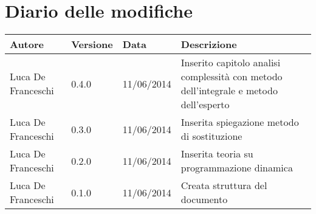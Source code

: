 \section*{Diario delle modifiche}

\begin{center}

	\begin{table}[htpd]
		\begin{tabular}{| l | l | l | p{50mm} |}
			\hline
			\hline
			\textbf{Autore} & \textbf{Versione} & \textbf{Data} & \textbf{Descrizione} \\
			\hline
			\hline
			Luca De Franceschi & 0.4.0 & 11/06/2014 & Inserito capitolo analisi complessità con metodo dell'integrale e metodo dell'esperto \\ \hline
			Luca De Franceschi & 0.3.0 & 11/06/2014 & Inserita spiegazione metodo di sostituzione \\ \hline
			Luca De Franceschi & 0.2.0 & 11/06/2014 & Inserita teoria su programmazione dinamica \\ \hline
			Luca De Franceschi & 0.1.0 & 11/06/2014 & Creata struttura del documento \\ \hline
		\end{tabular}
	\end{table}
	
\end{center}